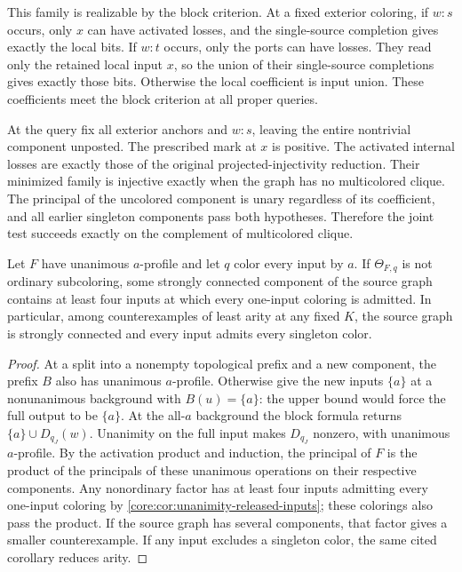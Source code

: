 This family is realizable by the block criterion.
At a fixed exterior coloring, if $w{:}s$ occurs,
only $x$ can have activated losses, and the
single-source completion gives exactly the local
bits. If $w{:}t$ occurs, only the ports can have
losses. They read only the retained local input
$x$, so the union of their single-source
completions gives exactly those bits. Otherwise
the local coefficient is input union. These
coefficients meet the block criterion at all
proper queries.

At the query fix all exterior anchors and $w{:}s$,
leaving the entire nontrivial component unposted.
The prescribed mark at $x$ is positive. The
activated internal losses are exactly those of
the original projected-injectivity reduction.
Their minimized family is injective exactly when
the graph has no multicolored clique. The
principal of the uncolored component is unary
regardless of its coefficient, and all earlier
singleton components pass both hypotheses.
Therefore the joint test succeeds exactly on
the complement of multicolored clique.

\begin{corollary}
\label{core:cor:unanimity-source-component}
Let $F$ have unanimous $a$-profile and let $q$ color every input by
$a$. If $\Theta_{F,q}$ is not ordinary subcoloring, some strongly
connected component of the source graph contains at least four inputs
at which every one-input coloring is admitted. In particular, among
counterexamples of least arity at any fixed $K$, the source graph is
strongly connected and every input admits every singleton color.
\end{corollary}
\begin{proof}
At a split into a nonempty topological prefix and a new component,
the prefix $B$ also has unanimous $a$-profile. Otherwise give the
new inputs $\{a\}$ at a nonunanimous background with $B(u)=\{a\}$:
the upper bound would force the full output to be $\{a\}$.
At the all-$a$ background the block formula returns
$\{a\}\cup D_{q_J}(w)$. Unanimity on the full input makes $D_{q_J}$
nonzero, with unanimous $a$-profile. By the activation product and
induction, the principal of $F$ is the product of the principals of
these unanimous operations on their respective components.
Any nonordinary factor has at least four inputs admitting every
one-input coloring by \cref{core:cor:unanimity-released-inputs};
these colorings also pass the product. If the source graph has several
components, that factor gives a smaller counterexample. If any input
excludes a singleton color, the same cited corollary reduces arity.
\end{proof}

